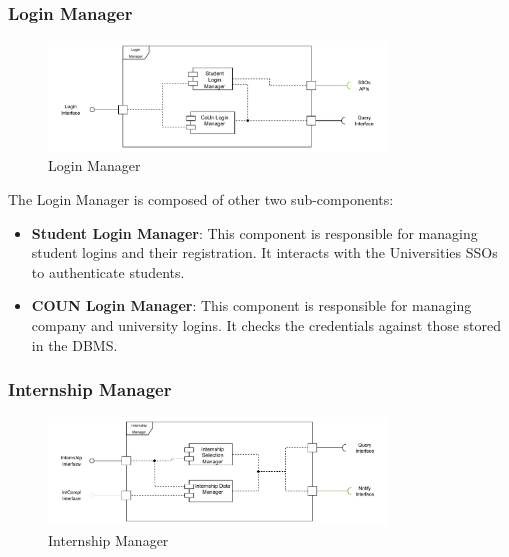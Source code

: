 \subsubsection{Login Manager}
\label{subsub:login-manager}%

\begin{figure}[H]
      \centering
      \includegraphics[width=0.8\textwidth]{Images/Login_Architecture.pdf}
      \caption{Login Manager}
      \label{login-manager-arch}
\end{figure}

\par The Login Manager is composed of other two sub-components:
\begin{itemize}
      \item \textbf{Student Login Manager}: This component is responsible for managing student logins
            and their registration. It interacts with the Universities SSOs to authenticate students.
      \item \textbf{COUN Login Manager}: This component is responsible for managing company and university logins.
            It checks the credentials against those stored in the DBMS.
\end{itemize}

\subsubsection{Internship Manager}
\label{subsub:internship-manager}%

\begin{figure}[H]
      \centering
      \includegraphics[width=0.8\textwidth]{Images/Internship_Architecture.pdf}
      \caption{Internship Manager}
      \label{internship-manager-arch}
\end{figure}

